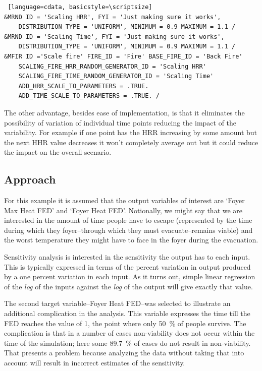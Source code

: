 \documentclass[12pt,twoside]{book}
\begin{document}
\vspace{\baselineskip}
\begin{lstlisting} [language=cdata, basicstyle=\scriptsize]
&MRND ID = 'Scaling HRR', FYI = 'Just making sure it works',
	DISTRIBUTION_TYPE = 'UNIFORM', MINIMUM = 0.9 MAXIMUM = 1.1 /
&MRND ID = 'Scaling Time', FYI = 'Just making sure it works',
	DISTRIBUTION_TYPE = 'UNIFORM', MINIMUM = 0.9 MAXIMUM = 1.1 /
&MFIR ID ='Scale fire' FIRE_ID = 'Fire' BASE_FIRE_ID = 'Back Fire'
	SCALING_FIRE_HRR_RANDOM_GENERATOR_ID = 'Scaling HRR'
    SCALING_FIRE_TIME_RANDOM_GENERATOR_ID = 'Scaling Time'
    ADD_HRR_SCALE_TO_PARAMETERS = .TRUE.
    ADD_TIME_SCALE_TO_PARAMETERS = .TRUE. /
\end{lstlisting}

The other advantage, besides ease of implementation, is that it eliminates the possibility of variation of individual time points reducing the impact of the variability. For example if one point has the HRR increasing by some amount but the next HHR value decreases it won't completely average out but it could reduce the impact on the overall scenario.

\hypertarget{approach}{%
\subsection{Approach}\label{approach}}

For this example it is assumed that the output variables of interest are `Foyer Max Heat FED' and `Foyer Heat FED'. Notionally, we might say that we are interested in the amount of time people have to escape (represented by the time during which they foyer--through which they must evacuate--remains viable) and the worst temperature they might have to face in the foyer during the evacuation.

Sensitivity analysis is interested in the sensitivity the output has to each input. This is typically expressed in terms of the percent variation in output produced by a one percent variation in each input. As it turns out, simple linear regression of the \emph{log} of the inputs against the \emph{log} of the output will give exactly that value.

The second target variable--Foyer Heat FED--was selected to illustrate an additional complication in the analysis. This variable expresses the time till the FED reaches the value of 1, the point where only 50~\% of people survive. The complication is that in a number of cases non-viability does not occur within the time of the simulation; here some 89.7~\% of cases do not result in non-viability. That presents a problem because analyzing the data without taking that into account will result in incorrect estimates of the sensitivity.
\end{document}
